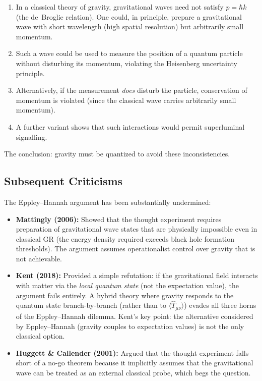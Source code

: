 \documentclass[12pt,a4paper]{article}
\begin{document}
\begin{enumerate}
\item In a classical theory of gravity, gravitational waves need not satisfy $p = \hbar k$ (the de~Broglie relation). One could, in principle, prepare a gravitational wave with short wavelength (high spatial resolution) but arbitrarily small momentum.
\item Such a wave could be used to measure the position of a quantum particle without disturbing its momentum, violating the Heisenberg uncertainty principle.
\item Alternatively, if the measurement \emph{does} disturb the particle, conservation of momentum is violated (since the classical wave carries arbitrarily small momentum).
\item A further variant shows that such interactions would permit superluminal signalling.
\end{enumerate}

The conclusion: gravity must be quantized to avoid these inconsistencies.

\subsection{Subsequent Criticisms}

The Eppley--Hannah argument has been substantially undermined:

\begin{itemize}
\item \textbf{Mattingly (2006):} Showed that the thought experiment requires preparation of gravitational wave states that are physically impossible even in classical GR (the energy density required exceeds black hole formation thresholds). The argument assumes operationalist control over gravity that is not achievable.

\item \textbf{Kent (2018):} Provided a simple refutation: if the gravitational field interacts with matter via the \emph{local quantum state} (not the expectation value), the argument fails entirely. A hybrid theory where gravity responds to the quantum state branch-by-branch (rather than to $\langle\hat{T}_{\mu\nu}\rangle$) evades all three horns of the Eppley--Hannah dilemma. Kent's key point: the alternative considered by Eppley--Hannah (gravity couples to expectation values) is not the only classical option.

\item \textbf{Huggett \& Callender (2001):} Argued that the thought experiment falls short of a no-go theorem because it implicitly assumes that the gravitational wave can be treated as an external classical probe, which begs the question.
\end{itemize}
\end{document}
